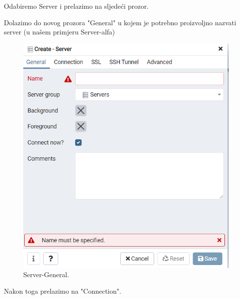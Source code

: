		 	 Odabiremo Server i prelazimo na sljedeći prozor.
			 
			 Dolazimo do novog prozora "General" u kojem je potrebno proizvoljno nazvati server (u našem primjeru Server-alfa)
			 \begin{figure}[H]
			 	\includegraphics[scale=1]{slike/server general.png} 
			 	\centering
			 	\caption{ Server-General.}
			 	\label{DS}
			 \end{figure}
			 
			 Nakon toga prelazimo na "Connection". 
			 
